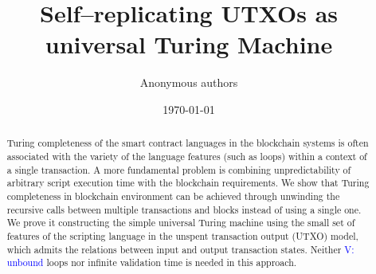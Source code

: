 \documentclass[runningheads]{llncs}
\newcommand{\dnote}[1]{\textcolor{red}{D: {#1}}}
\newcommand{\vk}[1]{\textcolor{blue}{V: {#1}}}
\begin{document}
    \title{Self--replicating UTXOs as universal Turing Machine}

    \author{Anonymous authors}

    \date{\today}
    \maketitle

    \begin{abstract}
        Turing completeness of the smart contract languages in the blockchain
        systems is often associated with the variety of the language features
        (such as loops) within a context of a single transaction.
        A more fundamental problem is combining unpredictability of arbitrary
        script execution time with the blockchain requirements.
        We show that Turing completeness in blockchain environment can
        be achieved through unwinding the recursive calls between
        multiple transactions and blocks instead of using a single one. We prove
        it constructing the simple universal Turing machine using
        the small set of features of the scripting language in the unspent
        transaction output (UTXO) model, which admits the relations between
        input and output transaction states.
        Neither \vk{unbound} loops nor infinite validation time is needed in this approach.
    \end{abstract}
\end{document}

